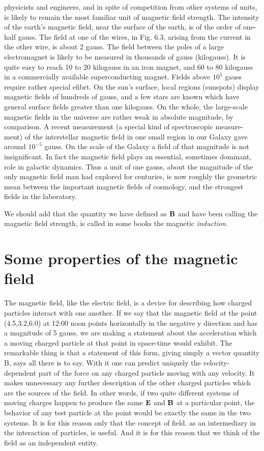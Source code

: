 physicists and engineers, and in spite of competition from other systems
of units, is likely to remain the most familiar unit of magnetic
field strength. The intensity of the earth's magnetic field, near the
surface of the earth, is of the order of one-half gauss. The field at
one of the wires, in Fig. 6.3, arising from the current in the other wire,
is about 2 gauss. The field between the poles of a large electromagnet
is likely to be measured in thousands of gauss (kilogauss). It is quite
easy to reach 10 to 20 kilogauss in an iron magnet, and 60 to 80 kilogauss
in a commercially available superconducting magnet. Fields
above $10^5$ gauss require rather special efibrt. On the sun's surface,
local regions (sunspots) display magnetic fields of hundreds of gauss,
and a few stars are known which have general surface fields greater
than one kilogauss. On the whole, the large-scale magnetic fields in
the universe are rather weak in absolute magnitude, by comparison.
A recent measurement (a special kind of spectroscopic measure-
ment) of the interstellar magnetic field in one small region in our
Galaxy gave around $10^{-5}$ gauss. On the scale of the Galaxy a field
of that magnitude is not insignificant. In fact the magnetic field plays
an essential, sometimes dominant, role in galactic dynamics. Thus a
unit of one gauss, about the magnitude of the only magnetic field
man had explored for centuries, is now roughly the geometric mean
between the important magnetic fields of cosmology, and the strongest
fields in the laboratory.

We should add that the quantity we have defined as $\mathbf{B}$ and have
been calling the magnetic field strength, is called in some books the
magnetic \emph{induction}.

\iffalse

\section{Some properties of the magnetic field}

The magnetic field, like the electric field, is a device for describing
how charged particles interact with one another. If we say that the
magnetic field at the point (4.5,3.2,6.0) at 12:00 noon points horizontally
in the negative y direction and has a magnitude of 5 gauss.
we are making a statement about the acceleration which a moving
charged particle at that point in space-time would exhibit. The remarkable
thing is that a statement of this form, giving simply a vector
quantity B, says all there is to say. With it one can predict uniquely
the velocity-dependent part of the force on any charged particle moving
with any velocity. It makes unnecessary any further description
of the other charged particles which are the sources of the field. In
other words, if two quite different systems of moving charges happen
to produce the same $\mathbf{E}$ and $\mathbf{B}$ at a particular point, the behavior of
any test particle at the point would be exactly the same in the two
systems. It is for this reason only that the concept of field. as an intermediary
in the interaction of particles, is useful. And it is for this
reason that we think of the field as an independent entity.

